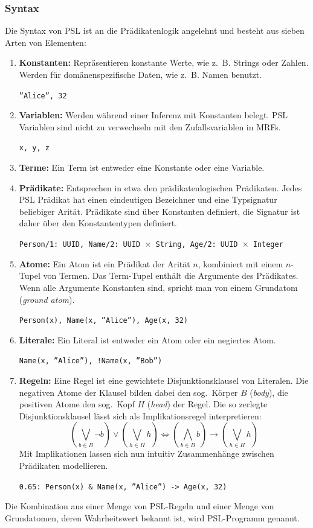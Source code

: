 \subsubsection{Syntax}
Die Syntax von PSL ist an die Prädikatenlogik angelehnt und besteht aus sieben Arten von Elementen:
\begin{enumerate}
	\item \textbf{Konstanten:}
		Repräsentieren konstante Werte, wie z.~B. Strings oder Zahlen.
		Werden für domänenspezifische Daten, wie z.~B. Namen benutzt. \\
		\centerline{\texttt{''Alice'', 32}}
	\item \textbf{Variablen:}
		Werden während einer Inferenz mit Konstanten belegt.
		PSL Variablen sind nicht zu verwechseln mit den Zufallsvariablen in MRFs. \\
		\centerline{\texttt{x, y, z}}
	\item \textbf{Terme:}
		Ein Term ist entweder eine Konstante oder eine Variable.
	\item \textbf{Prädikate:}
		Entsprechen in etwa den prädikatenlogischen Prädikaten.
		Jedes PSL Prädikat hat einen eindeutigen Bezeichner und eine Typsignatur beliebiger Arität.
		Prädikate sind über Konstanten definiert, die Signatur ist daher über den Konstantentypen definiert. \\
		\centerline{\texttt{Person/1: UUID, Name/2: UUID $\times$ String, Age/2: UUID $\times$ Integer}}
	\item \textbf{Atome:}
		Ein Atom ist ein Prädikat der Arität $n$, kombiniert mit einem $n$-Tupel von Termen.
		Das Term-Tupel enthält die Argumente des Prädikates.
		Wenn alle Argumente Konstanten sind, spricht man von einem Grundatom (\textit{ground atom}). \\
		\centerline{\texttt{Person(x), Name(x, ''Alice''), Age(x, 32)}} %
	\item \textbf{Literale:}
		Ein Literal ist entweder ein Atom oder ein negiertes Atom. \\
		\centerline{\texttt{Name(x, ''Alice''), !Name(x, ''Bob'')}} %
	\item \textbf{Regeln:}
		Eine Regel ist eine gewichtete Disjunktionsklausel von Literalen.
		Die negativen Atome der Klausel bilden dabei den sog.\ Körper $B$ (\textit{body}), die positiven Atome den sog.\ Kopf $H$ (\textit{head}) der Regel.
		Die so zerlegte Disjunktionsklausel lässt sich als Implikationsregel interpretieren:
		\[
			\left(\bigvee_{b \in B} \lnot b\right) \lor \left(\bigvee_{h \in H} h\right) \Leftrightarrow \left(\bigwedge_{b \in B}  b\right) \rightarrow \left(\bigvee_{h \in H} h\right)
		\]
		Mit Implikationen lassen sich nun intuitiv Zusammenhänge zwischen Prädikaten modellieren.\\
		\centerline{\texttt{0.65: Person(x) \& Name(x, ''Alice'') -> Age(x, 32)}} %
\end{enumerate}

Die Kombination aus einer Menge von PSL-Regeln und einer Menge von Grundatomen, deren Wahrheitswert bekannt ist, wird PSL-Programm genannt.
